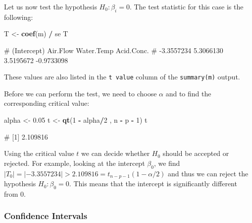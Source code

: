 \documentclass[
  a4paper,
]{article}
\newenvironment{Shaded}{\begin{snugshade}}{\end{snugshade}}
\newcommand{\DecValTok}[1]{\textcolor[rgb]{0.00,0.00,0.81}{#1}}
\newcommand{\FloatTok}[1]{\textcolor[rgb]{0.00,0.00,0.81}{#1}}
\newcommand{\FunctionTok}[1]{\textcolor[rgb]{0.13,0.29,0.53}{\textbf{#1}}}
\newcommand{\NormalTok}[1]{#1}
\newcommand{\OtherTok}[1]{\textcolor[rgb]{0.56,0.35,0.01}{#1}}
\newcommand{\SpecialCharTok}[1]{\textcolor[rgb]{0.81,0.36,0.00}{\textbf{#1}}}
\theoremstyle{definition}
\theoremstyle{definition}
\theoremstyle{definition}
\theoremstyle{definition}
\theoremstyle{remark}
\begin{document}
Let us now test the hypothesis \(H_0\colon \beta_i = 0\). The test statistic
for this case is the following:

\begin{Shaded}
\begin{Highlighting}[]
\NormalTok{T }\OtherTok{\textless{}{-}} \FunctionTok{coef}\NormalTok{(m) }\SpecialCharTok{/}\NormalTok{ se}
\NormalTok{T}
\end{Highlighting}
\end{Shaded}

\begin{Shaded}
\begin{Highlighting}[]
\NormalTok{\# (Intercept)    Air.Flow  Water.Temp  Acid.Conc. }
\NormalTok{\#  {-}3.3557234   5.3066130   3.5195672  {-}0.9733098}
\end{Highlighting}
\end{Shaded}

These values are also listed in the \texttt{t\ value} column of the \texttt{summary(m)}
output.

Before we can perform the test, we need to choose \(\alpha\) and to
find the corresponding critical value:

\begin{Shaded}
\begin{Highlighting}[]
\NormalTok{alpha }\OtherTok{\textless{}{-}} \FloatTok{0.05}
\NormalTok{t }\OtherTok{\textless{}{-}} \FunctionTok{qt}\NormalTok{(}\DecValTok{1} \SpecialCharTok{{-}}\NormalTok{ alpha}\SpecialCharTok{/}\DecValTok{2}\NormalTok{ , n }\SpecialCharTok{{-}}\NormalTok{ p }\SpecialCharTok{{-}} \DecValTok{1}\NormalTok{)}
\NormalTok{t}
\end{Highlighting}
\end{Shaded}

\begin{Shaded}
\begin{Highlighting}[]
\NormalTok{\# [1] 2.109816}
\end{Highlighting}
\end{Shaded}

Using the critical value \(t\) we can decide whether \(H_0\) should be accepted or
rejected. For example, looking at the intercept \(\beta_0\), we find \(|T_0| =
|-3.3557234| > 2.109816 = t_{n-p-1}(1-\alpha/2)\) and thus we can reject the
hypothesis \(H_0\colon \beta_0 = 0\). This means that the intercept is
significantly different from 0.

\subsubsection{Confidence Intervals}\label{confidence-intervals-1}
\end{document}
